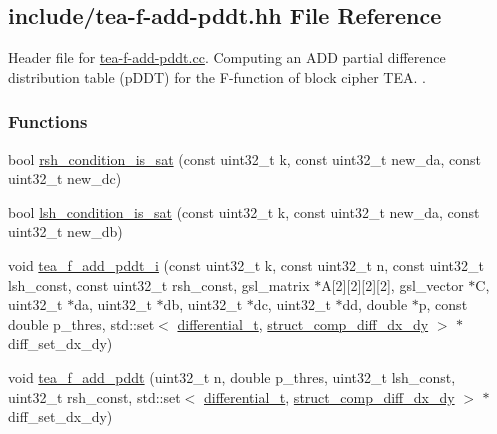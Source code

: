 \hypertarget{tea-f-add-pddt_8hh}{\subsection{include/tea-\/f-\/add-\/pddt.hh \-File \-Reference}
\label{tea-f-add-pddt_8hh}
}


\-Header file for \hyperlink{tea-f-add-pddt_8cc}{tea-\/f-\/add-\/pddt.\-cc}. \-Computing an \-A\-D\-D partial difference distribution table (p\-D\-D\-T) for the \-F-\/function of block cipher \-T\-E\-A. .  


\subsubsection*{\-Functions}
\begin{DoxyCompactItemize}
\item 
bool \hyperlink{tea-f-add-pddt_8hh_a9a9b0ca87b727a966ffb1842ffa389e3}{rsh\-\_\-condition\-\_\-is\-\_\-sat} (const uint32\-\_\-t k, const uint32\-\_\-t new\-\_\-da, const uint32\-\_\-t new\-\_\-dc)
\item 
bool \hyperlink{tea-f-add-pddt_8hh_a55f531edb6fd0ce85c20b47e890475e3}{lsh\-\_\-condition\-\_\-is\-\_\-sat} (const uint32\-\_\-t k, const uint32\-\_\-t new\-\_\-da, const uint32\-\_\-t new\-\_\-db)
\item 
void \hyperlink{tea-f-add-pddt_8hh_ae8e09fe95cc3eb4257b868d91f8924ec}{tea\-\_\-f\-\_\-add\-\_\-pddt\-\_\-i} (const uint32\-\_\-t k, const uint32\-\_\-t n, const uint32\-\_\-t lsh\-\_\-const, const uint32\-\_\-t rsh\-\_\-const, gsl\-\_\-matrix $\ast$\-A\mbox{[}2\mbox{]}\mbox{[}2\mbox{]}\mbox{[}2\mbox{]}\mbox{[}2\mbox{]}, gsl\-\_\-vector $\ast$\-C, uint32\-\_\-t $\ast$da, uint32\-\_\-t $\ast$db, uint32\-\_\-t $\ast$dc, uint32\-\_\-t $\ast$dd, double $\ast$p, const double p\-\_\-thres, std\-::set$<$ \hyperlink{structdifferential__t}{differential\-\_\-t}, \hyperlink{structstruct__comp__diff__dx__dy}{struct\-\_\-comp\-\_\-diff\-\_\-dx\-\_\-dy} $>$ $\ast$diff\-\_\-set\-\_\-dx\-\_\-dy)
\item 
void \hyperlink{tea-f-add-pddt_8hh_af962bfb5724a4f1dd45fdb2fdeac49f4}{tea\-\_\-f\-\_\-add\-\_\-pddt} (uint32\-\_\-t n, double p\-\_\-thres, uint32\-\_\-t lsh\-\_\-const, uint32\-\_\-t rsh\-\_\-const, std\-::set$<$ \hyperlink{structdifferential__t}{differential\-\_\-t}, \hyperlink{structstruct__comp__diff__dx__dy}{struct\-\_\-comp\-\_\-diff\-\_\-dx\-\_\-dy} $>$ $\ast$diff\-\_\-set\-\_\-dx\-\_\-dy)
\item 

\end{DoxyCompactItemize}
